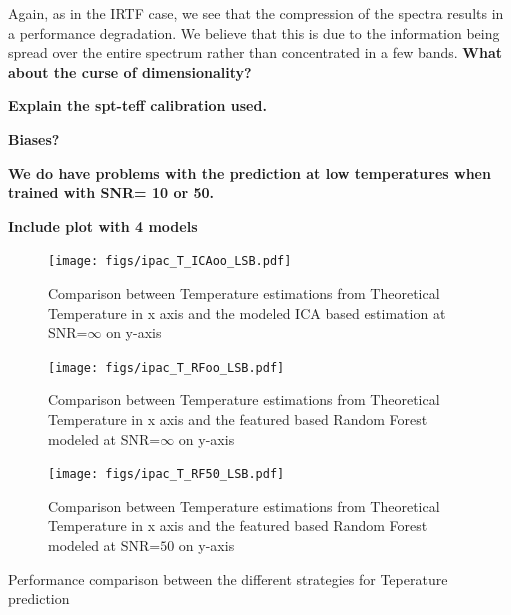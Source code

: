 Again, as in the IRTF case, we see that the compression of the spectra
results in a performance degradation. We believe that this is due to
the information being spread over the entire spectrum rather than
concentrated in a few bands. {\bf What about the curse of
  dimensionality? }




{\bf Explain the spt-teff calibration used.}

{\bf Biases?}

{\bf We do have problems with the prediction at low temperatures when
trained with SNR= 10 or 50.}

{\bf Include plot with 4 models}

\begin {figure*}
 \centering
 \begin{subfigure}{.35\textwidth}
  \centering
  \texttt{[image: figs/ipac\_T\_ICAoo\_LSB.pdf]}
  \caption{Comparison between Temperature estimations from Theoretical Temperature 
  in x axis and the modeled ICA based estimation at SNR=$\infty$ on y-axis}
 \label{fig:ipac_icaoo_lsb}
 \end{subfigure}
  \begin{subfigure}{.35\textwidth}
  \centering
  \texttt{[image: figs/ipac\_T\_RFoo\_LSB.pdf]}
  \caption{Comparison between Temperature estimations from Theoretical Temperature 
  in x axis and the featured based Random Forest modeled at SNR=$\infty$ on y-axis}
 \label{fig:ipac_rfoo_lsb}
 \end{subfigure}
  \begin{subfigure}{.35\textwidth}
  \centering
  \texttt{[image: figs/ipac\_T\_RF50\_LSB.pdf]}
  \caption{Comparison between Temperature estimations from Theoretical Temperature 
  in x axis and the featured based Random Forest modeled at SNR=$50$ on y-axis}
 \label{fig:ipac_rf50_lsb}
 \end{subfigure}
 \label {fig:comp01}
 \caption{Performance comparison between the different strategies for Teperature prediction}
\end {figure*}



